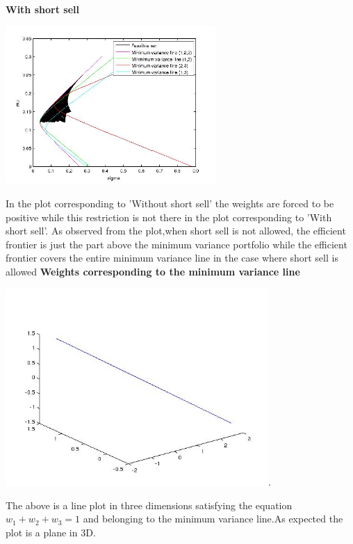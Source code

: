\documentclass{article}
\begin{document}
\textbf{With short sell}
\begin{center}
\includegraphics[width=80mm]{WithShortSell}
\end{center}

In the plot corresponding to 'Without short sell' the weights are forced to be positive while this restriction is not there in the plot corresponding to 'With short sell'. As observed from the plot,when short sell is not allowed, the efficient frontier is just the part above the minimum variance portfolio while the efficient frontier covers the entire minimum variance line in the case where short sell is allowed
\newpage
\textbf{Weights corresponding to the minimum variance line}
\begin{center}
\includegraphics[width=100mm]{w1_w2_w3}.
\end{center}

The above is a line plot in three dimensions satisfying the equation $w_{1}+w_{2}+w_{3} = 1$ and belonging to the minimum variance line.As expected the  plot is a plane in 3D.
\end{document}
